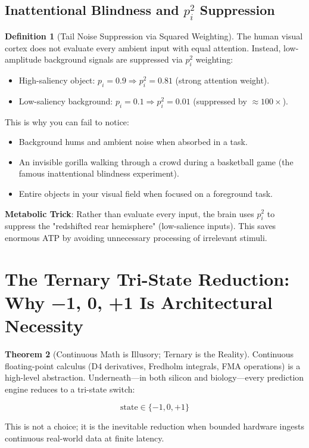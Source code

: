 \documentclass[11pt,oneside]{article}
\theoremstyle{definition}
\newtheorem{theorem}{Theorem}
\newtheorem{definition}[theorem]{Definition}
\begin{document}
\subsection{Inattentional Blindness and $p_i^2$ Suppression}

\begin{definition}[Tail Noise Suppression via Squared Weighting]
The human visual cortex does not evaluate every ambient input with equal attention. Instead, low-amplitude background signals are suppressed via $p_i^2$ weighting:

\begin{itemize}
  \item High-saliency object: $p_i = 0.9 \Rightarrow p_i^2 = 0.81$ (strong attention weight).
  \item Low-saliency background: $p_i = 0.1 \Rightarrow p_i^2 = 0.01$ (suppressed by $\approx 100\times$).
\end{itemize}

This is why you can fail to notice:
\begin{itemize}
  \item Background hums and ambient noise when absorbed in a task.
  \item An invisible gorilla walking through a crowd during a basketball game (the famous inattentional blindness experiment).
  \item Entire objects in your visual field when focused on a foreground task.
\end{itemize}

\textbf{Metabolic Trick}: Rather than evaluate every input, the brain uses $p_i^2$ to suppress the "redshifted rear hemisphere" (low-salience inputs). This saves enormous ATP by avoiding unnecessary processing of irrelevant stimuli.
\end{definition}

\section{The Ternary Tri-State Reduction: Why {−1, 0, +1} Is Architectural Necessity}

\begin{theorem}[Continuous Math is Illusory; Ternary is the Reality]
Continuous floating-point calculus (D4 derivatives, Fredholm integrals, FMA operations) is a high-level abstraction. Underneath—in both silicon and biology—every prediction engine reduces to a tri-state switch:

\[
\text{state} \in \{-1, 0, +1\}
\]

This is not a choice; it is the inevitable reduction when bounded hardware ingests continuous real-world data at finite latency.
\end{theorem}
\end{document}
